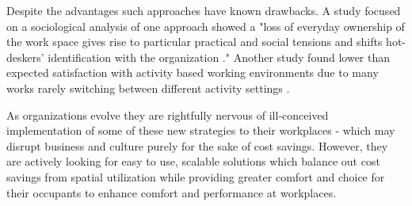 \documentclass[]{interact}
\theoremstyle{plain}%
\theoremstyle{definition}
\theoremstyle{remark}
\begin{document}
Despite the advantages such approaches have known drawbacks. A study focused on a sociological analysis of one approach showed a "loss of everyday ownership of the work space gives rise to particular practical and social tensions and shifts hot-deskers’ identification with the organization \cite{Hirst2011SettlersHot-desking}." Another study found lower than expected satisfaction with activity based working environments due to many works rarely switching between different activity settings \citep{Hoendervanger2016FlexibilityEnvironments}. 

As organizations evolve they are rightfully nervous of ill-conceived implementation of some of these new strategies to their workplaces - which may disrupt business and culture purely for the sake of cost savings. However, they are actively looking for easy to use, scalable solutions which balance out cost savings from spatial utilization while providing greater comfort and choice for their occupants to enhance comfort and performance at workplaces. 




  
\end{document}

